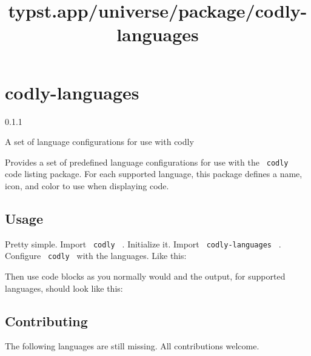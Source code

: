 \title{typst.app/universe/package/codly-languages}

\label{banner}
\section{codly-languages}\label{codly-languages}

{ 0.1.1 }

A set of language configurations for use with codly

\label{readme}
Provides a set of predefined language configurations for use with the
\texttt{\ codly\ } code listing package. For each supported language,
this package defines a name, icon, and color to use when displaying
code.

\subsection{Usage}\label{usage}

Pretty simple. Import \texttt{\ codly\ } . Initialize it. Import
\texttt{\ codly-languages\ } . Configure \texttt{\ codly\ } with the
languages. Like this:

\begin{Shaded}
\begin{Highlighting}[]

\end{Highlighting}
\end{Shaded}

Then use code blocks as you normally would and the output, for supported
languages, should look like this:


\subsection{Contributing}\label{contributing}

The following languages are still missing. All contributions welcome.

